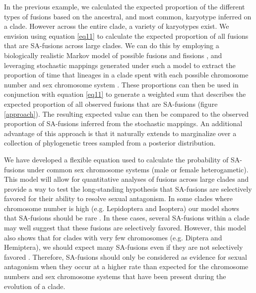 \documentclass[12pt]{article}
\begin{document}
In the previous example, we calculated the expected proportion of the different types of fusions based on the ancestral, and most common, karyotype inferred on a clade.
However across the entire clade, a variety of karyotypes exist.
We envision using equation \ref{eq11} to calculate the expected proportion of all fusions that are SA-fusions across large clades.
We can do this by employing a biologically realistic Markov model of possible fusions and fissions \citep{blackmon2019}, and leveraging stochastic mappings generated under such a model to extract the proportion of time that lineages in a clade spent with each possible chromosome number and sex chromosome system \citep{huelsenbeck2003, revell2012}.
These proportions can then be used in conjunction with equation \ref{eq11} to generate a weighted sum that describes the expected proportion of all observed fusions that are SA-fusions (figure \ref{approach}).
The resulting expected value can then be compared to the observed proportion of SA-fusions inferred from the stochastic mappings.
An additional advantage of this approach is that it naturally extends to marginalize over a collection of phylogenetic trees sampled from a posterior distribution.

We have developed a flexible equation used to calculate the probability of SA-fusions under common sex chromosome systems (male or female heterogametic).
This model will allow for quantitative analyses of fusions across large clades and provide a way to test the long-standing hypothesis that SA-fusions are selectively favored for their ability to resolve sexual antagonism.
In some clades where chromosome number is high (e.g. Lepidoptera and Isoptera) our model shows that SA-fusions should be rare \citep{blackmon2017}.
In these cases, several SA-fusions within a clade may well suggest that these fusions are selectively favored. 
However, this model also shows that for clades with very few chromosomes (e.g. Diptera and Hemiptera), we should expect many SA-fusions even if they are not selectively favored \citep{blackmon2017}.
Therefore, SA-fusions should only be considered as evidence for sexual antagonism when they occur at a higher rate than expected for the chromosome numbers and sex chromosome systems that have been present during the evolution of a clade.

\clearpage
\end{document}
